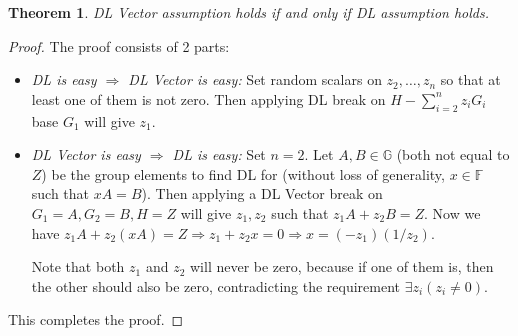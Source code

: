 \documentclass{article}
\newtheorem{theorem}{Theorem}[section]
\begin{document}
\begin{theorem}
DL Vector assumption holds if and only if DL assumption holds.
\end{theorem}
\begin{proof}
The proof consists of 2 parts:
\begin{itemize}
    \item \textit{DL is easy $\Rightarrow$ DL Vector is easy:} Set random scalars on $z_2,\ldots,z_n$ so that at least one of them is not zero. Then applying DL break on $H - \sum_{i=2}^{n}{z_i G_i}$ base $G_1$ will give $z_1$.
    \item \textit{DL Vector is easy $\Rightarrow$ DL is easy:} Set $n=2$. Let $A, B\in\mathbb{G}$ (both not equal to $Z$) be the group elements to find DL for (without loss of generality, $x\in\mathbb{F}$ such that $xA=B$). Then applying a DL Vector break on $G_1=A, G_2=B, H=Z$ will give $z_1, z_2$ such that $z_1 A + z_2 B = Z$. Now we have $z_1 A + z_2 (xA) = Z \Rightarrow z_1 + z_2 x = 0 \Rightarrow x = (-z_1)(1/z_2)$.

Note that both $z_1$ and $z_2$ will never be zero, because if one of them is, then the other should also be zero, contradicting the requirement $\exists z_i(z_i \neq 0)$.
\end{itemize}
This completes the proof.
\end{proof}

%
%
\end{document}
